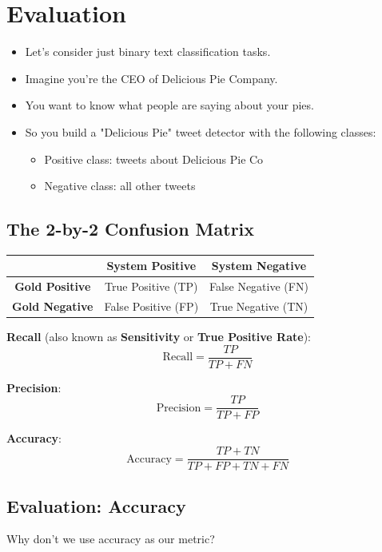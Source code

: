 \section{Evaluation}

\begin{itemize}
 \item Let's consider just binary text classification tasks. 
 \item Imagine you're the CEO of Delicious Pie Company. 
\item You want to know what people are saying about your pies. 
\item So you build a "Delicious Pie" tweet detector with the following classes:
\begin{itemize}
\item Positive class: tweets about Delicious Pie Co
\item Negative class: all other tweets
\end{itemize}
\end{itemize}



\subsection{The 2-by-2 Confusion Matrix}
\begin{table}[h]
\centering
\begin{tabular}{|c|c|c|}
\hline
\textbf{} & \textbf{System Positive} & \textbf{System Negative} \\
\hline
\textbf{Gold Positive} & True Positive (TP) & False Negative (FN) \\
\hline
\textbf{Gold Negative} & False Positive (FP) & True Negative (TN) \\
\hline
\end{tabular}
\end{table}

\textbf{Recall} (also known as \textbf{Sensitivity} or \textbf{True Positive Rate}):
\[ \text{Recall} = \frac{TP}{TP + FN} \]

\textbf{Precision}:
\[ \text{Precision} = \frac{TP}{TP + FP} \]

\textbf{Accuracy}:
\[ \text{Accuracy} = \frac{TP + TN}{TP + FP + TN + FN} \]


\subsection{Evaluation: Accuracy}
Why don't we use accuracy as our metric?

